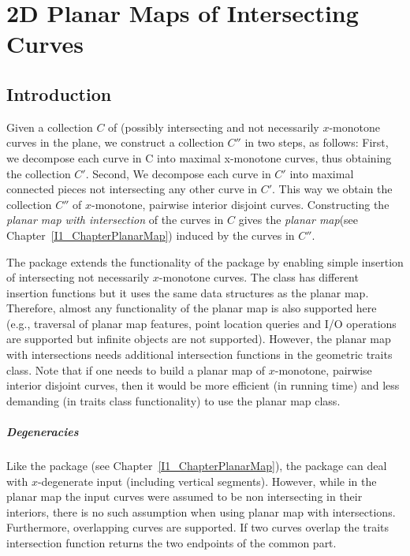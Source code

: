 
\chapter{2D Planar Maps of Intersecting Curves} \label{I1_ChapterPmwx}

\section{Introduction}

Given a collection $C$ of (possibly intersecting and not necessarily
$x$-monotone curves in the plane, we construct a collection $C''$ in
two steps, as follows: First, we decompose each curve in C into
maximal x-monotone curves, thus obtaining the collection
$C'$. Second, We decompose each curve in $C'$ into maximal connected
pieces not intersecting any other curve in $C'$.  This way we obtain
the collection $C''$ of $x$-monotone, pairwise interior disjoint
curves.  Constructing the {\it planar map with intersection} of the
curves in $C$ gives the {\it planar map}(see
Chapter~\ref{I1_ChapterPlanarMap}) induced by the curves in $C''$.

  The  package extends the
  functionality of the  package by enabling simple
  insertion of intersecting not necessarily $x$-monotone curves. The
   class has different insertion
  functions but it uses the same data structures as the planar
  map. Therefore, almost any functionality of the planar map is also
  supported here (e.g., traversal of planar map features, point
  location queries and I/O operations are supported but infinite
  objects are not supported). However, the planar map with
  intersections needs additional intersection functions in the
  geometric traits class. Note that if one needs to build a planar map
  of $x$-monotone, pairwise interior disjoint curves, then it would be
  more efficient (in running time) and less demanding (in traits class
  functionality) to use the planar map class.

\paragraph{Degeneracies} 
  Like the  package (see
  Chapter~\ref{I1_ChapterPlanarMap}), the  package can deal with $x$-degenerate input (including
  vertical segments). However, while in the planar map the input
  curves were assumed to be non intersecting in their interiors, there
  is no such assumption when using planar map with
  intersections. Furthermore, overlapping curves are supported. If two
  curves overlap the traits intersection function returns the two
  endpoints of the common part.

